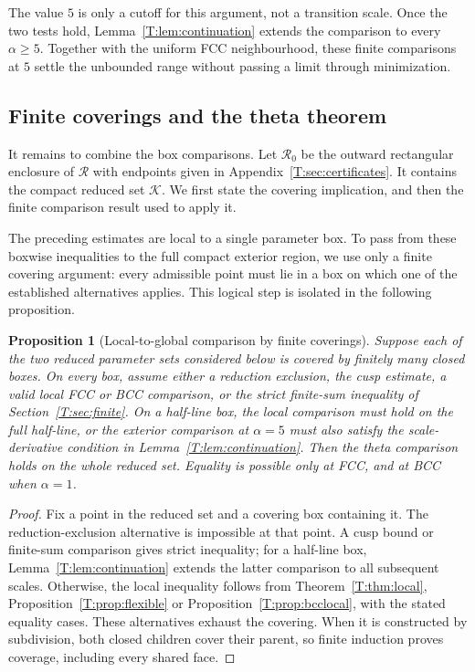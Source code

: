 \documentclass[reqno,english]{amsart}
\newtheorem{proposition}[theorem]{Proposition}
\theoremstyle{definition}
\newtheorem{open problem}[theorem]{Open Problem}
\theoremstyle{remark}
\theoremstyle{plain}
\numberwithin{equation}{section}
\newcommand{\calK}{\mathcal K}
\begin{document}
The value $5$ is only a cutoff for this argument, not a transition
scale. Once the two tests hold, Lemma~\ref{T:lem:continuation}
extends the comparison to every $\alpha\ge5$. Together with the
uniform FCC neighbourhood, these finite comparisons at $5$ settle
the unbounded range without passing a limit through minimization.

\subsection{Finite coverings and the theta theorem}\label{T:sec:assembly}
It remains to combine the box comparisons. Let $\mathcal R_0$ be the
outward rectangular enclosure of $\mathcal R$ with endpoints given
in Appendix~\ref{T:sec:certificates}. It contains the compact
reduced set $\calK$. We first state the covering implication, and
then the finite comparison result used to apply it.

The preceding estimates are local to a single parameter box. To pass from these boxwise inequalities to the full compact exterior region, we use only a finite covering argument: every admissible point must lie in a box on which one of the established alternatives applies. This logical step is isolated in the following proposition.

\begin{proposition}[Local-to-global comparison by finite coverings]
\label{T:prop:computer}
Suppose each of the two reduced parameter sets considered below is
covered by finitely many closed boxes. On every box, assume either a
reduction exclusion, the cusp estimate, a valid local FCC or BCC
comparison, or the strict finite-sum inequality of
Section~\ref{T:sec:finite}. On a half-line box, the local comparison must
hold on the full half-line, or the exterior comparison at $\alpha=5$ must also
satisfy the scale-derivative condition in
Lemma~\ref{T:lem:continuation}.
Then the theta comparison holds on the whole reduced set. Equality is
possible only at FCC, and at BCC when $\alpha=1$.
\end{proposition}
\begin{proof}
Fix a point in the reduced set and a covering box containing it.
The reduction-exclusion alternative is impossible at that point.
A cusp bound or finite-sum comparison gives strict inequality; for a
half-line box, Lemma~\ref{T:lem:continuation} extends the latter
comparison to all subsequent scales. Otherwise, the local inequality
follows from Theorem~\ref{T:thm:local},
Proposition~\ref{T:prop:flexible} or
Proposition~\ref{T:prop:bcclocal}, with the stated equality cases.
These alternatives exhaust the covering. When it is constructed by
subdivision, both closed children cover their parent, so finite
induction proves coverage, including every shared face.
\end{proof}
\end{document}
